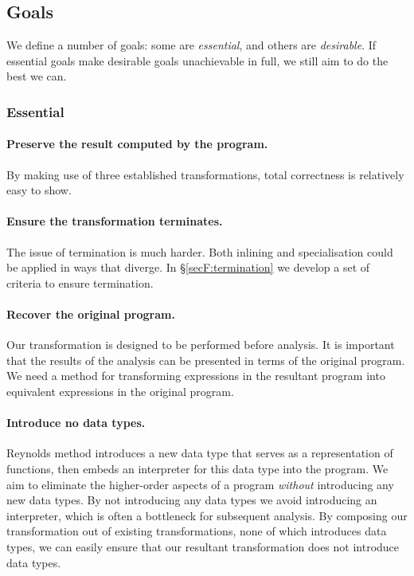 \subsection{Goals}
\label{secF:goals}

We define a number of goals: some are \textit{essential}, and others are \textit{desirable}. If essential goals make desirable goals unachievable in full, we still aim to do the best we can.

\subsubsection*{Essential}

\paragraph{Preserve the result computed by the program.} By making use of three established transformations, total correctness is relatively easy to show.

\paragraph{Ensure the transformation terminates.} The issue of termination is much harder. Both inlining and specialisation could be applied in ways that diverge. In \S\ref{secF:termination} we develop a set of criteria to ensure termination.

\paragraph{Recover the original program.} Our transformation is designed to be performed before analysis. It is important that the results of the analysis can be presented in terms of the original program. We need a method for transforming expressions in the resultant program into equivalent expressions in the original program.

\paragraph{Introduce no data types.} Reynolds method introduces a new data type that serves as a representation of functions, then embeds an interpreter for this data type into the program. We aim to eliminate the higher-order aspects of a program \textit{without} introducing any new data types. By not introducing any data types we avoid introducing an interpreter, which is often a bottleneck for subsequent analysis. By composing our transformation out of existing transformations, none of which introduces data types, we can easily ensure that our resultant transformation does not introduce data types.


